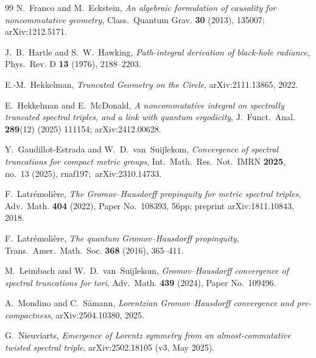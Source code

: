 \documentclass[11pt,a4paper]{article}
\theoremstyle{plain}
\theoremstyle{definition}
\begin{document}
\begin{thebibliography}{99}
N.~Franco and M.~Eckstein,
\newblock \emph{An algebraic formulation of causality for
noncommutative geometry},
\newblock Class.~Quantum Grav. \textbf{30} (2013), 135007;
\newblock arXiv:1212.5171.

J.~B.~Hartle and S.~W.~Hawking,
\newblock \emph{Path-integral derivation of black-hole radiance},
\newblock Phys.~Rev. D \textbf{13} (1976), 2188--2203.

E.-M.~Hekkelman,
\newblock \emph{Truncated Geometry on the Circle},
\newblock arXiv:2111.13865, 2022.

E.~Hekkelman and E.~McDonald,
\newblock \emph{A noncommutative integral on spectrally truncated
spectral triples, and a link with quantum ergodicity},
\newblock J.~Funct.~Anal. \textbf{289}(12) (2025) 111154;
\newblock arXiv:2412.00628.

Y.~Gaudillot-Estrada and W.~D.~van~Suijlekom,
\newblock \emph{Convergence of spectral truncations for compact
metric groups},
\newblock Int.~Math.~Res.~Not.\ IMRN \textbf{2025}, no.~13 (2025),
rnaf197;\ arXiv:2310.14733.

F.~Latr\'emoli\`ere,
\newblock \emph{The Gromov--Hausdorff propinquity for metric spectral
triples},
\newblock Adv.~Math. \textbf{404} (2022), Paper No.~108393, 56pp;
\newblock preprint arXiv:1811.10843, 2018.

F.~Latr\'emoli\`ere,
\newblock \emph{The quantum Gromov--Hausdorff propinquity},
\newblock Trans.~Amer.~Math.~Soc. \textbf{368} (2016), 365--411.

M.~Leimbach and W.~D.~van~Suijlekom,
\newblock \emph{Gromov--Hausdorff convergence of spectral truncations
for tori},
\newblock Adv.~Math. \textbf{439} (2024), Paper No.~109496.

A.~Mondino and C.~Sämann,
\newblock \emph{Lorentzian Gromov--Hausdorff convergence and
pre-compactness},
\newblock arXiv:2504.10380, 2025.

G.~Nieuviarts,
\newblock \emph{Emergence of Lorentz symmetry from an
almost-commutative twisted spectral triple},
\newblock arXiv:2502.18105 (v3, May 2025).


\end{thebibliography}
\end{document}
